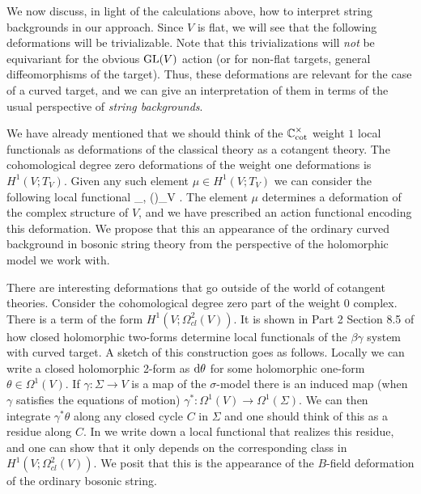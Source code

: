 We now discuss, in light of the calculations above, how to interpret string backgrounds in our approach. 
Since $V$ is flat,
we will see that the following deformations will be trivializable. 
Note that this trivializations will {\em not} be equivariant for the obvious ${\rm GL}(V)$ action (or for non-flat targets, general diffeomorphisms of the target). 
Thus, these deformations are relevant for the case of a curved target, and we can give an interpretation of them in terms of the usual perspective of {\em string backgrounds}. 

We have already mentioned that we should think of the $\mathbb C^\times_{\rm cot}$ weight $1$ local functionals as deformations of the classical theory as a cotangent theory.
The cohomological degree zero deformations of the weight one deformations is $H^1(V ; T_V)$. 
Given any such element $\mu \in H^1(V ; T_V)$ we can consider the following local functional
\ben
\int_\Sigma \<\beta, \mu(\gamma)\>_V .
\een 
The element $\mu$ determines a deformation of the complex structure of $V$, and we have prescribed an action functional encoding this deformation. 
We propose that this an appearance of the ordinary curved background in bosonic string theory from the perspective of the holomorphic model we work with.

There are interesting deformations that go outside of the world of cotangent theories. 
Consider the cohomological degree zero part of the weight 0 complex. 
There is a term of the form $H^1(V ; \Omega^2_{cl}(V))$.
It is shown in Part 2 Section 8.5 of \cite{ggw} how closed holomorphic two-forms determine local functionals of the $\beta\gamma$ system with curved target. 
A sketch of this construction goes as follows.
Locally we can write a closed holomorphic 2-form as ${\rm d} \theta$ for some holomorphic one-form $\theta \in \Omega^1(V)$. 
If $\gamma : \Sigma \to V$ is a map of the $\sigma$-model there is an induced map (when $\gamma$ satisfies the equations of motion) $\gamma^* : \Omega^1(V) \to \Omega^1(\Sigma)$. 
We can then integrate $\gamma^* \theta$ along any closed cycle $C$ in $\Sigma$ and one should think of this as a residue along $C$. 
In \cite{ggw} we write down a local functional that realizes this residue, and one can show that it only depends on the corresponding class in $H^1(V ; \Omega^2_{cl}(V))$. 
We posit that this is the appearance of the $B$-field deformation of the ordinary bosonic string. 



